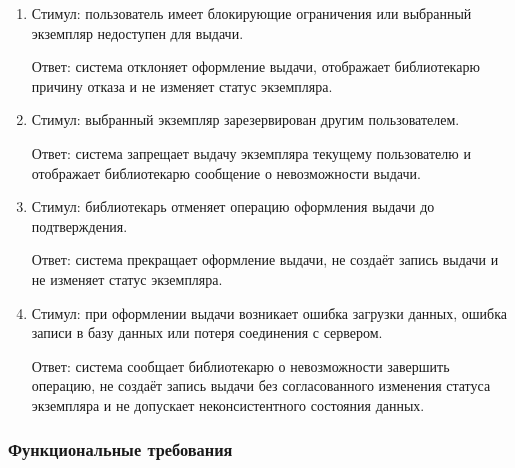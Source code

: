 \documentclass[12pt,a4paper]{article}
\begin{document}
\begin{enumerate}
		\item Стимул: пользователь имеет блокирующие ограничения или выбранный экземпляр
		недоступен для выдачи.
		
		Ответ: система отклоняет оформление выдачи, отображает библиотекарю причину
		отказа и не изменяет статус экземпляра.
		
		\item Стимул: выбранный экземпляр зарезервирован другим пользователем.
		
		Ответ: система запрещает выдачу экземпляра текущему пользователю и отображает
		библиотекарю сообщение о невозможности выдачи.
		
		\item Стимул: библиотекарь отменяет операцию оформления выдачи до подтверждения.
		
		Ответ: система прекращает оформление выдачи, не создаёт запись выдачи
		и не изменяет статус экземпляра.
		
		\item Стимул: при оформлении выдачи возникает ошибка загрузки данных, ошибка
		записи в базу данных или потеря соединения с сервером.
		
		Ответ: система сообщает библиотекарю о невозможности завершить операцию,
		не создаёт запись выдачи без согласованного изменения статуса экземпляра
		и не допускает неконсистентного состояния данных.
	\end{enumerate}
	
	\subsubsection{Функциональные требования}
	
\end{document}
